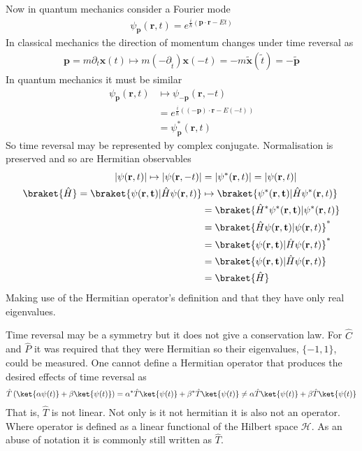 Now in quantum mechanics consider a Fourier mode
\begin{align*}
\psi_\mathbf{p}(\mathbf{r},t) = e^{\frac{i}{\hbar}(\mathbf{p}\cdot\mathbf{r}-Et)}
\end{align*}
In classical mechanics the direction of momentum changes under time reversal as
\begin{align*}
\mathbf{p} = m\partial_t \mathbf{x}(t) \mapsto m (-\partial_{\tilde{t}})\mathbf{x}(-t) = -m\mathbf{\tilde{x}}(\tilde{t}) = -\mathbf{\tilde{p}}
\end{align*}
In quantum mechanics it must be similar
\begin{align*}
\psi_\mathbf{p}(\mathbf{r},t)&\mapsto \psi_{-\mathbf{p}}(\mathbf{r},-t) \\
&=e^{\frac{i}{\hbar}((-\mathbf{p})\cdot\mathbf{r}-E(-t))} \\
&=\psi_\mathbf{p}^*(\mathbf{r},t)
\end{align*}
So time reversal may be represented by complex conjugate. Normalisation is preserved and so are Hermitian observables
\begin{align*}
|\psi(\mathbf{r},t)| \mapsto |\psi(\mathbf{r},-t)|&=|\psi^*(\mathbf{r},t)|=|\psi(\mathbf{r},t)| \\
\braket{\hat{H}}=\braket{\psi(\mathbf{r,t})|\hat{H}\psi(\mathbf{r},t)}&\mapsto \braket{\psi^*(\mathbf{r,t})|\hat{H}\psi^*(\mathbf{r},t)} \\
&= \braket{\hat{H}^*\psi^*(\mathbf{r,t})|\psi^*(\mathbf{r},t)} \\
&= \braket{\hat{H}\psi(\mathbf{r,t})|\psi(\mathbf{r},t)}^* \\
&= \braket{\psi(\mathbf{r,t})|\hat{H}\psi(\mathbf{r},t)}^* \\
&= \braket{\psi(\mathbf{r,t})|\hat{H}\psi(\mathbf{r},t)} \\
&= \braket{\hat{H}}
\end{align*}
Making use of the Hermitian operator's definition and that they have only real eigenvalues. 

Time reversal may be a symmetry but it does not give a conservation law. For $\hat{C}$ and $\hat{P}$ it was required that they were Hermitian so their eigenvalues, $\{-1,1\}$, could be measured. One cannot define a Hermitian operator that produces the desired effects of time reversal as
\begin{align*}
\hat{T}\left(\ket{\alpha\psi(t)}+\beta \ket{\psi(t)}\right) = \alpha^*\hat{T} \ket{\psi(t)}+\beta^*\hat{T} \ket{ \psi(t)} \neq  \alpha\hat{T} \ket{\psi(t)}+\beta\hat{T} \ket{ \psi(t)}
\end{align*}
That is, $\hat{T}$ is not linear. Not only is it not hermitian it is also not an operator. Where operator is defined as a linear functional of the Hilbert space $\mathcal{H}$. As an abuse of notation it is commonly still written as $\hat{T}$.

